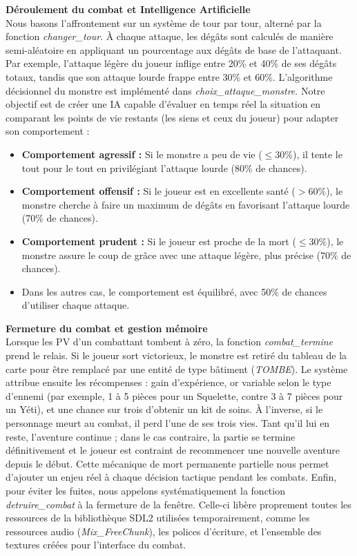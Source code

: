\documentclass[11pt,a4paper]{article}
\begin{document}
\medskip

\textbf{Déroulement du combat et Intelligence Artificielle} \\

Nous basons l'affrontement sur un système de tour par tour, alterné par la fonction \emph{changer\_tour}. À chaque attaque, les dégâts sont calculés de manière semi-aléatoire en appliquant un pourcentage aux dégâts de base de l'attaquant. Par exemple, l'attaque légère du joueur inflige entre 20\% et 40\% de ses dégâts totaux, tandis que son attaque lourde frappe entre 30\% et 60\%.
L'algorithme décisionnel du monstre est implémenté dans \emph{choix\_attaque\_monstre}. Notre objectif est de créer une IA capable d'évaluer en temps réel la situation en comparant les points de vie restants (les siens et ceux du joueur) pour adapter son comportement :
\begin{itemize}
    \item \textbf{Comportement agressif :} Si le monstre a peu de vie ($\le 30\%$), il tente le tout pour le tout en privilégiant l'attaque lourde (80\% de chances).
    \item \textbf{Comportement offensif :} Si le joueur est en excellente santé ($> 60\%$), le monstre cherche à faire un maximum de dégâts en favorisant l'attaque lourde (70\% de chances).
    \item \textbf{Comportement prudent :} Si le joueur est proche de la mort ($\le 30\%$), le monstre assure le coup de grâce avec une attaque légère, plus précise (70\% de chances).
    \item Dans les autres cas, le comportement est équilibré, avec 50\% de chances d'utiliser chaque attaque.
\end{itemize}

\medskip

\textbf{Fermeture du combat et gestion mémoire} \\

Lorsque les PV d'un combattant tombent à zéro, la fonction \emph{combat\_termine} prend le relais. Si le joueur sort victorieux, le monstre est retiré du tableau de la carte pour être remplacé par une entité de type bâtiment (\emph{TOMBE}). Le système attribue ensuite les récompenses : gain d'expérience, or variable selon le type d'ennemi (par exemple, 1 à 5 pièces pour un Squelette, contre 3 à 7 pièces pour un Yéti), et une chance sur trois d'obtenir un kit de soins.
À l'inverse, si le personnage meurt au combat, il perd l'une de ses trois vies. Tant qu'il lui en reste, l'aventure continue ; dans le cas contraire, la partie se termine définitivement et le joueur est contraint de recommencer une nouvelle aventure depuis le début. Cette mécanique de mort permanente partielle nous permet d'ajouter un enjeu réel à chaque décision tactique pendant les combats.
Enfin, pour éviter les fuites, nous appelons systématiquement la fonction \emph{detruire\_combat} à la fermeture de la fenêtre. Celle-ci libère proprement toutes les ressources de la bibliothèque SDL2 utilisées temporairement, comme les ressources audio (\emph{Mix\_FreeChunk}), les polices d'écriture, et l'ensemble des textures créées pour l'interface du combat.
\end{document}

